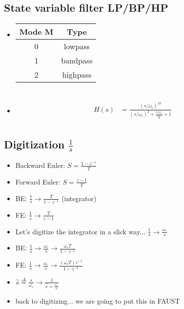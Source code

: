 \subsection*{State variable filter LP/BP/HP}
\begin{itemize}
\item{
\begin{tabular}{c | c}
Mode M & Type \\
\hline
0 & lowpass \\
1 & bandpass \\
2 & highpass \\
\end{tabular}
}

\begin{align*}
\end{align*}

\item{ 
\begin{align*}
H(s) &= \frac{(s / \omega_c)^M}{(s/ \omega_c)^2 + \frac{s/\omega_c}{Q} + 1}  \\
\end{align*}
}

\end{itemize}
\subsection*{Digitization $\frac{1}{s}$}

\begin{itemize}
\item{Backward Euler: $S = \frac{1 - z^{-1}}{T}$}
\item{Forward Euler: $S = \frac{z - 1}{T}$}
\item{BE: $\frac{1}{s} \rightarrow \frac{T}{1 - z^{-1}}$ (integrator)}
\item{FE: $\frac{1}{s} \rightarrow \frac{T}{z - 1}$}
\item{Let's digitize the integrator in a slick way... $\frac{1}{s} \rightarrow \frac{\omega_c}{s}$ }
\item{BE: $\frac{1}{s} \rightarrow \frac{\omega_c}{s} \rightarrow \frac{\omega_c T}{1 - z^{-1}}$}
\item{FE: $\frac{1}{s} \rightarrow \frac{\omega_c}{s} \rightarrow \frac{(\omega_c T)z^{-1}}{1 - z^{-1}}$} 
\item{$\stackrel{\sim}{s} \stackrel{\Delta}{=} \frac{s}{\omega_c} \rightarrow \frac{1}{\stackrel{\sim}{s} = \frac{\omega_c}{s}}$}
\item{back to digitizing... we are going to put this in FAUST
}
\end{itemize}


